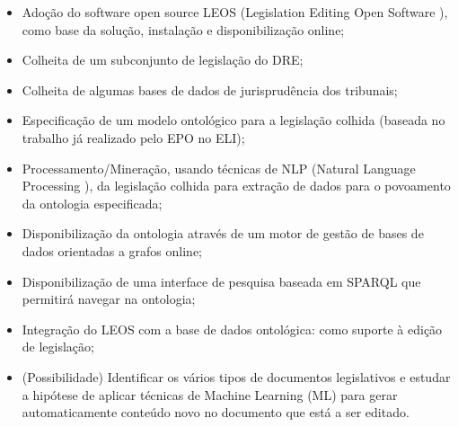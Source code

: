 \begin{itemize}
\item Adoção do software open source LEOS (Legislation Editing Open Software ), como base da
solução, instalação e disponibilização online;
\item Colheita de um subconjunto de legislação do DRE;
\item Colheita de algumas bases de dados de jurisprudência dos tribunais;
\item Especificação de um modelo ontológico para a legislação colhida (baseada no trabalho já
realizado pelo EPO no ELI);
\item Processamento/Mineração, usando técnicas de NLP (Natural Language Processing ), da
legislação colhida para extração de dados para o povoamento da ontologia especificada;
\item Disponibilização da ontologia através de um motor de gestão de bases de dados orientadas a
grafos online;
\item Disponibilização de uma interface de pesquisa baseada em SPARQL que permitirá navegar na
ontologia;
\item Integração do LEOS com a base de dados ontológica: como suporte à edição de legislação;
\item  (Possibilidade) Identificar os vários tipos de documentos legislativos e estudar a hipótese de
aplicar técnicas de Machine Learning (ML) para gerar automaticamente conteúdo novo no
documento que está a ser editado.
\end{itemize}

